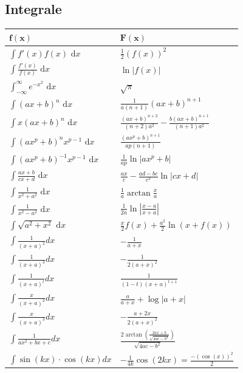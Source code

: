 \documentclass[7pt,landscape, margin = 0.1mm]{article}
\def\dx{\text{ d}x}
\begin{document}
\begin{multicols}{4}
\subsection{Integrale}
\begin{center}
 \begin{tabularx}{\linewidth}{>{\centering\arraybackslash}X>{\centering\arraybackslash}X}
  \toprule
  $\mathbf{f(x)}$ & $\mathbf{F(x)}$ \\
  \midrule
  $\int f'(x) f(x) \dx$ & $\frac{1}{2}(f(x))^2$ \\
  $\int \frac{f'(x)}{f(x)} \dx$ & $\ln|f(x)|$ \\
  $\int_{-\infty}^\infty e^{-x^2} \dx$ & $\sqrt{\pi}$ \\
  $\int (ax+b)^n \dx$ & $\frac{1}{a(n+1)}(ax+b)^{n+1}$ \\
  $\int x(ax+b)^n \dx$ & $\frac{(ax+b)^{n+2}}{(n+2)a^2} - \frac{b(ax+b)^{n+1}}{(n+1)a^2}$ \\
  $\int (ax^p+b)^n x^{p-1} \dx$ & $\frac{(ax^p+b)^{n+1}}{ap(n+1)}$ \\
  $\int (ax^p + b)^{-1} x^{p-1} \dx$ & $\frac{1}{ap} \ln |ax^p + b|$ \\
  $\int \frac{ax+b}{cx+d} \dx$ & $\frac{ax}{c} - \frac{ad-bc}{c^2} \ln |cx +d|$ \\
  $\int \frac{1}{x^2+a^2} \dx$ & $\frac{1}{a} \arctan \frac{x}{a}$ \\
  $\int \frac{1}{x^2 - a^2} \dx$ & $\frac{1}{2a} \ln\left| \frac{x-a}{x+a} \right|$ \\
  $\int \sqrt{a^2+x^2} \dx $ & $\frac{x}{2}f(x) + \frac{a^2}{2}\ln(x+f(x))$ \\

   
   
   
  $\int \frac{1}{(x+a)^2}dx$& $-\frac{1}{a+x}$ \\
$\int \frac{1}{(x+a)^3}dx$& $-\frac{1}{2(a+x)^2}$ \\
$\int \frac{1}{(x+a)^t}dx$& $\frac{1}{(1-t)(x+a)^{t+1}}$ \\
$\int \frac{x}{(x+a)^2}dx$& $\frac{a}{a+x}+\log |a+x|$ \\
$\int \frac{x}{(x+a)^3}dx$& $-\frac{a+2x}{2(a+x)^2}$ \\
$\int \frac{1}{ax^2+bx+c}dx$& $\frac{2 \arctan\left(\frac{2ax+b}{\sqrt{4ac-b^2}} \right)}{\sqrt{4ac-b^2}}$\\

  $\int \sin(kx)\cdot \cos(kx)dx$ & $-\frac{1}{4k}\cos(2kx)=\frac{-(\cos(x))^2}{2}$\\
  



\end{tabularx}
\end{center}
\end{multicols}
\end{document}

